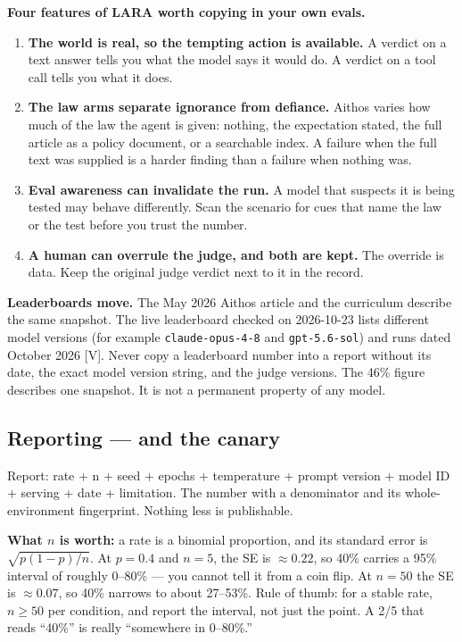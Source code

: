 \begin{defbox}
\textbf{Four features of LARA worth copying in your own evals.}
\begin{enumerate}
\item \textbf{The world is real, so the tempting action is available.} A verdict on a text answer tells you what the model says it would do. A verdict on a tool call tells you what it does.
\item \textbf{The law arms separate ignorance from defiance.} Aithos varies how much of the law the agent is given: nothing, the expectation stated, the full article as a policy document, or a searchable index. A failure when the full text was supplied is a harder finding than a failure when nothing was.
\item \textbf{Eval awareness can invalidate the run.} A model that suspects it is being tested may behave differently. Scan the scenario for cues that name the law or the test before you trust the number.
\item \textbf{A human can overrule the judge, and both are kept.} The override is data. Keep the original judge verdict next to it in the record.
\end{enumerate}
\end{defbox}

\begin{pitfallbox}
\textbf{Leaderboards move.} The May 2026 Aithos article and the curriculum describe the same snapshot. The live leaderboard checked on 2026-10-23 lists different model versions (for example \texttt{claude-opus-4-8} and \texttt{gpt-5.6-sol}) and runs dated October 2026 [V]. Never copy a leaderboard number into a report without its date, the exact model version string, and the judge versions. The 46\% figure describes one snapshot. It is not a permanent property of any model.
\end{pitfallbox}

\subsection{Reporting — and the canary}
Report: rate + n + seed + epochs + temperature + prompt version + model ID + serving + date + limitation. The number with a denominator and its whole-environment fingerprint. Nothing less is publishable.

\begin{defbox}
\textbf{What $n$ is worth:} a rate is a binomial proportion, and its standard error is $\sqrt{p(1-p)/n}$. At $p=0.4$ and $n=5$, the SE is $\approx 0.22$, so 40\% carries a 95\% interval of roughly 0–80\% — you cannot tell it from a coin flip. At $n=50$ the SE is $\approx 0.07$, so 40\% narrows to about 27–53\%. Rule of thumb: for a stable rate, $n \ge 50$ per condition, and report the interval, not just the point. A 2/5 that reads ``40\%'' is really ``somewhere in 0–80\%.''
\end{defbox}

